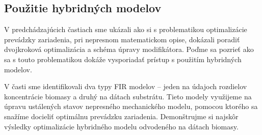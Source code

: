 \subsection{Použitie hybridných modelov}
V predchádzajúcich častiach sme ukázali ako si s problematikou optimalizácie prevádzky zariadenia, pri nepresnom matematickom opise, dokázali poradiť dvojkroková optimalizácia a schéma úpravy modifikátora. Poďme sa pozrieť ako sa s touto problematikou dokáže vysporiadať prístup s použitím hybridných modelov.

V časti  sme identifikovali dva typy FIR modelov -- jeden na údajoch rozdielov koncentrácie biomasy a druhý na dátach substrátu. Tieto modely využijeme na úpravu ustálených stavov nepresného mechanického modelu, pomocou ktorého sa snažíme docieliť optimálnu prevádzku zariadenia. Demonštrujme si najskôr výsledky optimalizácie hybridného modelu odvodeného na dátach biomasy.

